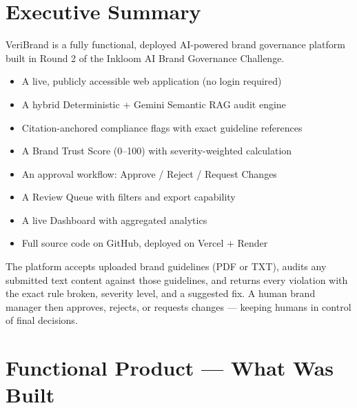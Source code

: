 \documentclass[11pt,a4paper]{article}
\begin{document}
\tableofcontents
\newpage

\section{Executive Summary}

VeriBrand is a fully functional, deployed AI-powered brand governance platform built in Round 2 of the Inkloom AI Brand Governance Challenge.

\begin{tcolorbox}[colback=successgreen!10, colframe=successgreen, arc=2mm, boxrule=0.5pt, title=\textbf{What We Delivered}]
\begin{itemize}
    \item A live, publicly accessible web application (no login required)
    \item A hybrid Deterministic + Gemini Semantic RAG audit engine
    \item Citation-anchored compliance flags with exact guideline references
    \item A Brand Trust Score (0--100) with severity-weighted calculation
    \item An approval workflow: Approve / Reject / Request Changes
    \item A Review Queue with filters and export capability
    \item A live Dashboard with aggregated analytics
    \item Full source code on GitHub, deployed on Vercel + Render
\end{itemize}
\end{tcolorbox}

\vspace{0.5cm}

The platform accepts uploaded brand guidelines (PDF or TXT), audits any submitted text content against those guidelines, and returns every violation with the exact rule broken, severity level, and a suggested fix. A human brand manager then approves, rejects, or requests changes --- keeping humans in control of final decisions.

\section{Functional Product --- What Was Built}
\end{document}
